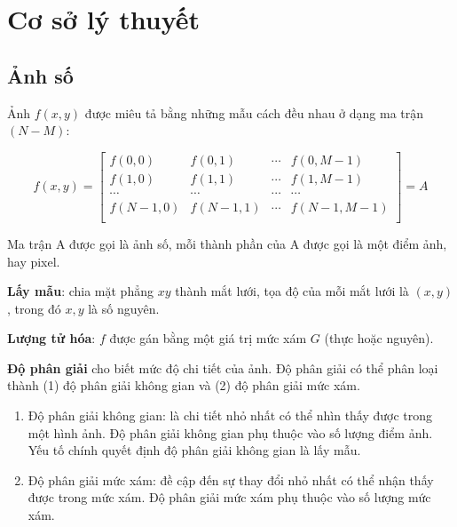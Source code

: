 \section{Cơ sở lý thuyết}

\subsection{Ảnh số}

Ảnh $f(x,y)$ được miêu tả bằng những mẫu cách đều nhau ở dạng ma trận $(N-M)$:

$$f(x,y) = \begin{bmatrix}
f(0,0) & f(0,1) & \cdots & f(0,M-1) \\
f(1,0) & f(1,1) & \cdots & f(1,M-1) \\
\cdots & \cdots & \cdots & \cdots \\
f(N-1,0) & f(N-1,1) & \cdots & f(N-1,M-1) \\
\end{bmatrix} = A$$

Ma trận A được gọi là ảnh số, mỗi thành phần của A được gọi là một điểm ảnh, hay pixel.

\textbf{Lấy mẫu}: chia mặt phẳng $xy$ thành mắt lưới, tọa độ của mỗi mắt lưới là $(x,y)$, trong đó $x,y$ là số nguyên.

\textbf{Lượng tử hóa}: $f$ được gán bằng một giá trị mức xám $G$ (thực hoặc nguyên).

\textbf{Độ phân giải} cho biết mức độ chi tiết của ảnh. Độ phân giải có thể phân loại thành (1) độ phân giải không gian và (2) độ phân giải mức xám.

\begin{enumerate}
    \item Độ phân giải không gian: là chi tiết nhỏ nhất có thể nhìn thấy được trong một hình ảnh. 
    Độ phân giải không gian phụ thuộc vào số lượng điểm ảnh. 
    Yếu tố chính quyết định độ phân giải không gian là lấy mẫu.

    \item Độ phân giải mức xám: đề cập đến sự thay đổi nhỏ nhất có thể nhận thấy được trong mức xám.
    Độ phân giải mức xám phụ thuộc vào số lượng mức xám.
\end{enumerate}

